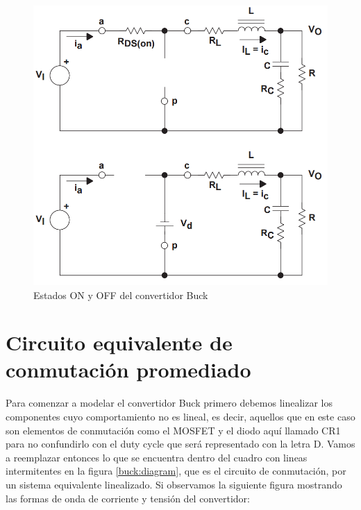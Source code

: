 \documentclass[12pt]{report}
\begin{document}
	\begin{figure}[H]
		\centering
		\includegraphics[width=\textwidth,height=\textheight,keepaspectratio]{buck_control_on_off}
		\caption{Estados ON y OFF del convertidor Buck}
	\end{figure}

\section{Circuito equivalente de conmutación promediado}

	Para comenzar a modelar el convertidor Buck primero debemos linealizar los componentes cuyo comportamiento no es lineal, es decir, aquellos que en este caso son elementos de conmutación como el MOSFET y el diodo aquí llamado CR1 para no confundirlo con el duty cycle que será representado con la letra D. Vamos a reemplazar entonces lo que se encuentra dentro del cuadro con lineas intermitentes en la figura \ref{buck:diagram}, que es el circuito de conmutación, por un sistema equivalente linealizado. Si observamos la siguiente figura mostrando las formas de onda de corriente y tensión del convertidor:
	
\end{document}
